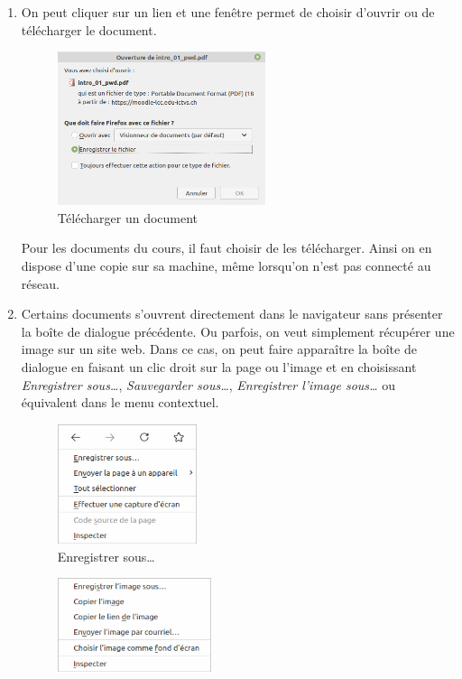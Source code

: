 \documentclass[10pt,a4paper]{report}
\begin{document}
\begin{enumerate}
	\item On peut cliquer sur un lien et une fenêtre permet de choisir d'ouvrir ou de télécharger le document.
		\begin{figure}[H]
			\centering
			\includegraphics[height=4.5cm]{images/capture_telechargement_01}
			\caption{Télécharger un document}
			\label{fig:capture_telechargement_01}
		\end{figure}
		\attention Pour les documents du cours, il faut choisir de les télécharger. Ainsi on en dispose d'une copie sur sa machine, même lorsqu'on n'est pas connecté au réseau.
	\item Certains documents s'ouvrent directement dans le navigateur sans présenter la boîte de dialogue précédente. Ou parfois, on veut simplement récupérer une image sur un site web. Dans ce cas, on peut faire apparaître la boîte de dialogue en faisant un clic droit sur la page ou l'image et en choisissant \emph{Enregistrer sous\dots}, \emph{Sauvegarder sous\dots}, \emph{Enregistrer l'image sous\dots} ou équivalent dans le menu contextuel. \\
		\begin{minipage}{.4\linewidth}
			\begin{figure}[H]
				\centering
				\includegraphics[height=3.5cm]{images/capture_telechargement_02}
				\caption{Enregistrer sous\dots}
				\label{fig:capture_telechargement_02}
			\end{figure}
		\end{minipage}
		\hfill
		\begin{minipage}{.45\linewidth}
			\begin{figure}[H]
				\centering
				\includegraphics[height=2.75cm]{images/capture_telechargement_03}

\end{figure}
\end{minipage}
\end{enumerate}
\end{document}
